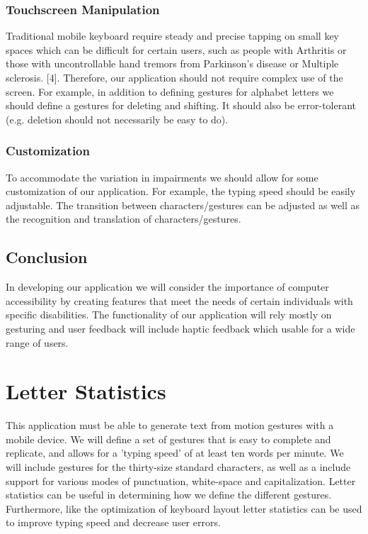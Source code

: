 \documentclass[onecolumn, draftclsnofoot,10pt, journal, letterpaper]{IEEEtran}
\begin{document}
\subsubsection{Touchscreen Manipulation}
Traditional mobile keyboard require steady and precise tapping on small key spaces which can be difficult for certain users, such as people with Arthritis or those with uncontrollable hand tremors from Parkinson's disease or Multiple sclerosis. [4]. Therefore, our application should not require complex use of the screen. For example, in addition to defining gestures for alphabet letters we should define a gestures for deleting and shifting. It should also be error-tolerant (e.g. deletion should not necessarily be easy to do).
\subsubsection{Customization}
To accommodate the variation in impairments we should allow for some customization of our application. For example, the typing speed should be easily adjustable. The transition between characters/gestures can be adjusted as well as the recognition and translation of characters/gestures.
\subsection{Conclusion}
In developing our application we will consider the importance of computer accessibility by creating features that meet the needs of certain individuals with specific disabilities. The functionality of our application will rely mostly on gesturing and user feedback will include haptic feedback which usable for a wide range of users. 

\section{Letter Statistics}
This application must be able to generate text from motion gestures with a mobile device. We will define a set of gestures that is easy to complete and replicate, and allows for a 'typing speed' of at least ten words per minute. We will include gestures for the thirty-size standard characters, as well as a include support for various modes of punctuation, white-space and capitalization. Letter statistics can be useful in determining how we define the different gestures. Furthermore, like the optimization of keyboard layout letter statistics can be used to improve typing speed and decrease user errors.
\end{document}
